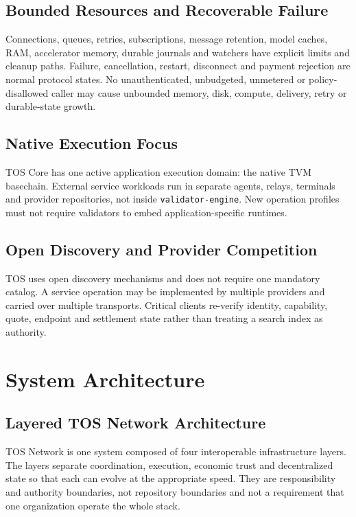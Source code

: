\documentclass[11pt,oneside]{article}
\begin{document}
\subsection{Bounded Resources and Recoverable Failure}

Connections, queues, retries, subscriptions, message retention, model caches, RAM,
accelerator memory, durable journals and watchers have explicit limits and cleanup paths.
Failure, cancellation, restart, disconnect and payment rejection are normal protocol states.
No unauthenticated, unbudgeted, unmetered or policy-disallowed caller may cause unbounded
memory, disk, compute, delivery, retry or durable-state growth.

\subsection{Native Execution Focus}

TOS Core has one active application execution domain: the native TVM basechain. External
service workloads run in separate agents, relays, terminals and provider repositories, not
inside \texttt{validator-engine}. New operation profiles must not require validators to embed
application-specific runtimes.

\subsection{Open Discovery and Provider Competition}

TOS uses open discovery mechanisms and does not require one mandatory catalog. A service
operation may be implemented by multiple providers and carried over multiple transports.
Critical clients re-verify identity, capability, quote, endpoint and settlement state rather
than treating a search index as authority.

\section{System Architecture}

\subsection{Layered TOS Network Architecture}

TOS Network is one system composed of four interoperable infrastructure layers. The layers
separate coordination, execution, economic trust and decentralized state so that each can
evolve at the appropriate speed. They are responsibility and authority boundaries, not
repository boundaries and not a requirement that one organization operate the whole stack.
\end{document}
